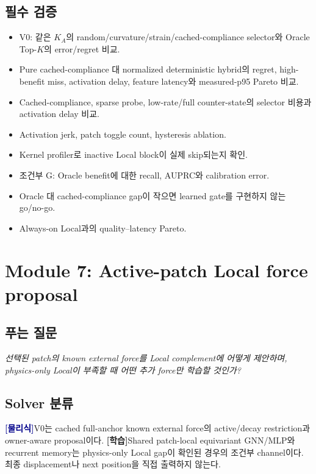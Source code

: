 \documentclass[11pt,a4paper]{article}
\newcommand{\physics}{\textcolor{darkblue}{\textbf{[물리식]}}}
\newcommand{\learned}{\textcolor{darkpurple}{\textbf{[학습]}}}
\begin{document}
\subsection*{필수 검증}

\begin{itemize}[leftmargin=1.5em]
  \item V0: 같은 \(K_A\)의 random/curvature/strain/cached-compliance selector와
  Oracle Top-\(K\)의 error/regret 비교.
  \item Pure cached-compliance 대 normalized deterministic hybrid의 regret,
  high-benefit miss, activation delay, feature latency와 measured-p95 Pareto 비교.
  \item Cached-compliance, sparse probe, low-rate/full counter-state의 selector 비용과 activation delay 비교.
  \item Activation jerk, patch toggle count, hysteresis ablation.
  \item Kernel profiler로 inactive Local block이 실제 skip되는지 확인.
  \item 조건부 G: Oracle benefit에 대한 recall, AUPRC와 calibration error.
  \item Oracle 대 cached-compliance gap이 작으면 learned gate를 구현하지 않는 go/no-go.
  \item Always-on Local과의 quality--latency Pareto.
\end{itemize}

\section{Module 7: Active-patch Local force proposal}

\subsection*{푸는 질문}

\emph{선택된 patch의 known external force를 Local complement에 어떻게 제안하며,
physics-only Local이 부족할 때 어떤 추가 force만 학습할 것인가?}

\subsection*{Solver 분류}

\physics V0는 cached full-anchor known external force의 active/decay restriction과 owner-aware proposal이다.
\learned Shared patch-local equivariant GNN/MLP와 recurrent memory는
physics-only Local gap이 확인된 경우의 조건부 channel이다.
최종 displacement나 next position을 직접 출력하지 않는다.
\end{document}

